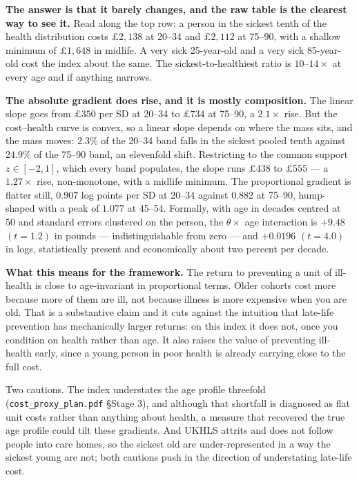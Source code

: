 \documentclass[11pt]{article}
\newcommand{\code}[1]{\texttt{\small #1}}
\begin{document}
\textbf{The answer is that it barely changes, and the raw table is the
clearest way to see it.} Read along the top row: a person in the sickest tenth
of the health distribution costs $\pounds2{,}138$ at 20--34 and $\pounds2{,}112$
at 75--90, with a shallow minimum of $\pounds1{,}648$ in midlife. A very sick
25-year-old and a very sick 85-year-old cost the index about the same. The
sickest-to-healthiest ratio is $10$--$14\times$ at every age and if anything
narrows.

\textbf{The absolute gradient does rise, and it is mostly composition.} The
linear slope goes from $\pounds350$ per SD at 20--34 to $\pounds734$ at
75--90, a $2.1\times$ rise. But the cost--health curve is convex, so a linear
slope depends on where the mass sits, and the mass moves: $2.3\%$ of the
20--34 band falls in the sickest pooled tenth against $24.9\%$ of the 75--90
band, an elevenfold shift. Restricting to the common support
$z \in [-2, 1]$, which every band populates, the slope runs $\pounds438$ to
$\pounds555$ --- a $1.27\times$ rise, non-monotone, with a midlife minimum.
The proportional gradient is flatter still, $0.907$ log points per SD at
20--34 against $0.882$ at 75--90, hump-shaped with a peak of $1.077$ at
45--54. Formally, with age in decades centred at 50 and standard errors
clustered on the person, the $\theta \times$ age interaction is
$+9.48$ $(t = 1.2)$ in pounds --- indistinguishable from zero --- and
$+0.0196$ $(t = 4.0)$ in logs, statistically present and economically about
two percent per decade.

\textbf{What this means for the framework.} The return to preventing a unit
of ill-health is close to age-invariant in proportional terms. Older cohorts
cost more because more of them are ill, not because illness is more expensive
when you are old. That is a substantive claim and it cuts against the
intuition that late-life prevention has mechanically larger returns: on this
index it does not, once you condition on health rather than age. It also
raises the value of preventing ill-health early, since a young person in poor
health is already carrying close to the full cost.

Two cautions. The index understates the age profile threefold
(\code{cost\_proxy\_plan.pdf} \S Stage 3), and although that shortfall is
diagnosed as flat unit costs rather than anything about health, a measure
that recovered the true age profile could tilt these gradients. And UKHLS
attrits and does not follow people into care homes, so the sickest old are
under-represented in a way the sickest young are not; both cautions push in
the direction of understating late-life cost.
\end{document}
